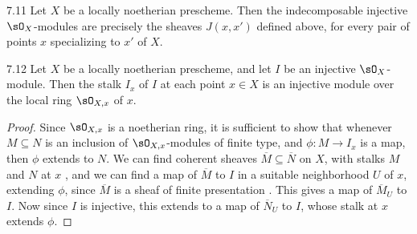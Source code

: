 \begin{booktheorem}{7.11}\label{thm:2.7.11}
Let $X$ be a locally noetherian prescheme. Then the indecomposable injective $\sO_X$-modules are precisely the sheaves $J(x,x')$ defined above, for every pair of points $x$ specializing to $x'$ of $X$.
\end{booktheorem}

\begin{booklemma}{7.12}\label{lem:2.7.12}
Let $X$ be a locally noetherian prescheme, and let $I$ be an injective $\sO_X$-module. Then the stalk $I_x$ of $I$ at each point $x\in X$ is an injective module over the local ring $\sO_{X,x}$ of $x$.
\end{booklemma}

\begin{proof}
Since $\sO_{X,x}$ is a noetherian ring, it is sufficient to show that whenever $M\subseteq N$ is an inclusion of $\sO_{X,x}$-modules of finite type, and $\phi\colon M\to I_x$ is a map, then $\phi$ extends to $N$. We can find coherent sheaves $\overline{M}\subseteq\overline{N}$ on $X$, with stalks $M$ and $N$ at $x$ \cite[\nopp I,~9.4.8]{EGA}, and we can find a map of $\overline{M}$ to $I$ in a suitable neighborhood $U$ of $x$, extending $\phi$, since $\overline{M}$ is a sheaf of finite presentation \cite[,~5.2.6]{EGA}. This gives a map of $\overline{M}_U$ to $I$. Now since $I$ is injective, this extends to a map of $\overline{N}_U$ to $I$, whose stalk at $x$ extends $\phi$.
\end{proof}


